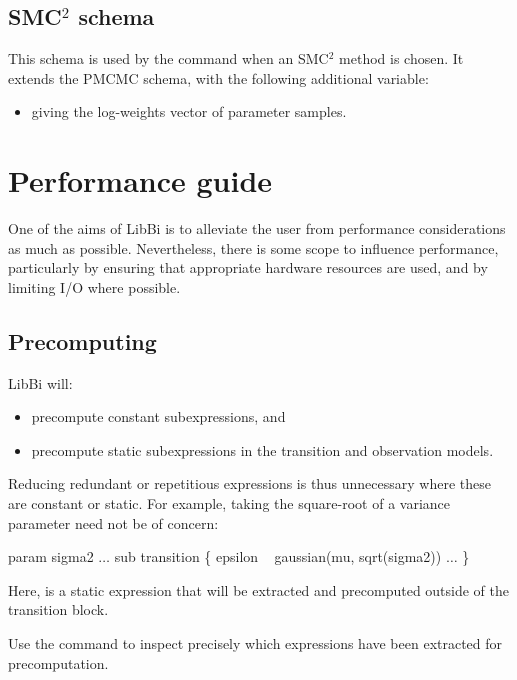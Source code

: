 \subsection{SMC$^2$ schema}

This schema is used by the  command when an SMC$^2$ method
is chosen. It extends the PMCMC schema, with the following additional
variable:
\begin{itemize}
\item {} giving the log-weights vector of parameter samples.
\end{itemize}

\section{Performance guide\label{Performance guide}}

One of the aims of LibBi is to alleviate the user from performance
considerations as much as possible. Nevertheless, there is some scope to
influence performance, particularly by ensuring that appropriate hardware
resources are used, and by limiting I/O where possible.

\subsection{Precomputing}

LibBi will:
\begin{itemize}
\item precompute constant subexpressions, and
\item precompute static subexpressions in the transition and observation
  models.
\end{itemize}
Reducing redundant or repetitious expressions is thus unnecessary where these
are constant or
static. For example, taking the square-root of a
variance parameter need not be of concern:
\begin{bicode}
param sigma2
\(\ldots\)
sub transition \{
  epsilon ~ gaussian(mu, sqrt(sigma2))
  \(\ldots\)
\}
\end{bicode}
Here,  is a static expression
that will be extracted and precomputed outside of the transition block.

\begin{tip}
Use the  command to inspect precisely which expressions
have been extracted for precomputation.
\end{tip}

